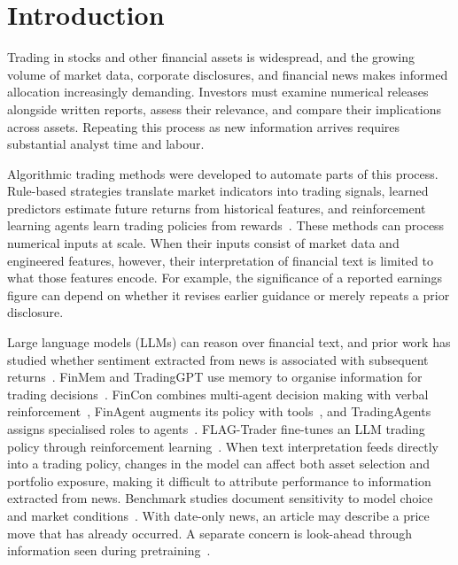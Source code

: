 \section{Introduction}

Trading in stocks and other financial assets is widespread, and the growing volume of market data, corporate disclosures, and financial news makes informed allocation increasingly demanding. Investors must examine numerical releases alongside written reports, assess their relevance, and compare their implications across assets. Repeating this process as new information arrives requires substantial analyst time and labour.

Algorithmic trading methods were developed to automate parts of this process. Rule-based strategies translate market indicators into trading signals, learned predictors estimate future returns from historical features, and reinforcement learning agents learn trading policies from rewards~\cite{liu2022finrlmeta}. These methods can process numerical inputs at scale. When their inputs consist of market data and engineered features, however, their interpretation of financial text is limited to what those features encode. For example, the significance of a reported earnings figure can depend on whether it revises earlier guidance or merely repeats a prior disclosure.

Large language models (LLMs) can reason over financial text, and prior work has studied whether sentiment extracted from news is associated with subsequent returns~\cite{lopezlira2023chatgpt}. FinMem and TradingGPT use memory to organise information for trading decisions~\cite{yu2024finmem,li2023tradinggpt}. FinCon combines multi-agent decision making with verbal reinforcement~\cite{yu2024fincon}, FinAgent augments its policy with tools~\cite{zhang2024finagent}, and TradingAgents assigns specialised roles to agents~\cite{xiao2024tradingagents}. FLAG-Trader fine-tunes an LLM trading policy through reinforcement learning~\cite{wang2025flagtrader}. When text interpretation feeds directly into a trading policy, changes in the model can affect both asset selection and portfolio exposure, making it difficult to attribute performance to information extracted from news. Benchmark studies document sensitivity to model choice and market conditions~\cite{li2024investorbench,li2025finsaber}. With date-only news, an article may describe a price move that has already occurred. A separate concern is look-ahead through information seen during pretraining~\cite{glasserman2023lookahead,lopezlira2025memorization}.

